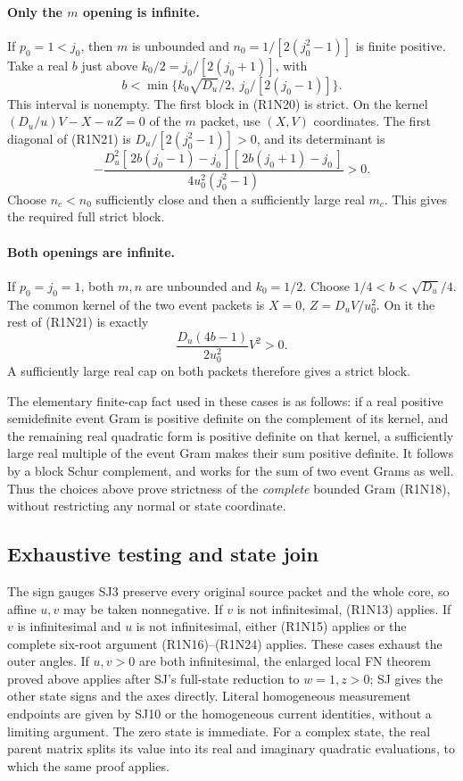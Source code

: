 \paragraph{Only the \(m\) opening is infinite.}
If $p_0=1<j_0$, then $m$ is unbounded and
$n_0=1/[2(j_0^2-1)]$ is finite positive.
Take a real $b$ just above $k_0/2=j_0/[2(j_0+1)]$, with
\[
 b<\min\{k_0\sqrt{D_u}/2,\ j_0/[2(j_0-1)]\}.
\]
This interval is nonempty.  The first block in (R1N20) is strict.
On the kernel $(D_u/u)V-X-uZ=0$ of the $m$ packet, use $(X,V)$
coordinates.  The first diagonal of (R1N21) is
$D_u/[2(j_0^2-1)]>0$, and its determinant is
\[
 -\frac{D_u^2[\,2b(j_0-1)-j_0\,][\,2b(j_0+1)-j_0\,]}
        {4u_0^2(j_0^2-1)}>0.                            \tag{R1N23}
\]
Choose $n_c<n_0$ sufficiently close and then a sufficiently large
real $m_c$.  This gives the required full strict block.

\paragraph{Both openings are infinite.}
If $p_0=j_0=1$, both $m,n$ are unbounded and $k_0=1/2$.
Choose
$1/4<b<\sqrt{D_u}/4$.
The common kernel of the two event packets is
$X=0$, $Z=D_uV/u_0^2$.  On it the rest of (R1N21) is exactly
\[
 \frac{D_u(4b-1)}{2u_0^2}V^2>0.                        \tag{R1N24}
\]
A sufficiently large real cap on both packets therefore gives
a strict block.

The elementary finite-cap fact used in these cases is as follows:
if a real positive semidefinite event Gram is positive definite on
the complement of its kernel, and the remaining real quadratic
form is positive definite on that kernel, a sufficiently large
real multiple of the event Gram makes their sum positive definite.
It follows by a block Schur complement, and works for the sum of
two event Grams as well.  Thus the choices above prove strictness
of the \emph{complete} bounded Gram (R1N18), without restricting
any normal or state coordinate.

\subsection{Exhaustive testing and state join}

The sign gauges SJ3 preserve every original source packet and the
whole core, so affine $u,v$ may be taken nonnegative.
If $v$ is not infinitesimal, (R1N13) applies.
If $v$ is infinitesimal and $u$ is not infinitesimal, either
(R1N15) applies or the complete six-root argument
(R1N16)--(R1N24) applies.  These cases exhaust the outer angles.
If $u,v>0$ are both infinitesimal, the enlarged local FN theorem
proved above applies after SJ's full-state reduction to $w=1,z>0$;
SJ gives the other state signs and the axes directly.
Literal homogeneous measurement endpoints are given by SJ10 or
the homogeneous current identities, without a limiting argument.
The zero state is immediate.  For a complex state, the real
parent matrix splits its value into its real and imaginary
quadratic evaluations, to which the same proof applies.

